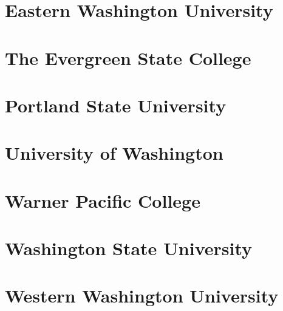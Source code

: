\documentclass[
]{book}
\begin{document}
\hypertarget{eastern-washington-university}{%
\chapter{Eastern Washington University}\label{eastern-washington-university}}

\hypertarget{the-evergreen-state-college}{%
\chapter{The Evergreen State College}\label{the-evergreen-state-college}}

\hypertarget{portland-state-university}{%
\chapter{Portland State University}\label{portland-state-university}}

\hypertarget{university-of-washington}{%
\chapter{University of Washington}\label{university-of-washington}}

\hypertarget{warner-pacific-college}{%
\chapter{Warner Pacific College}\label{warner-pacific-college}}

\hypertarget{washington-state-university}{%
\chapter{Washington State University}\label{washington-state-university}}

\hypertarget{western-washington-university}{%
\chapter{Western Washington University}\label{western-washington-university}}

  
\end{document}
